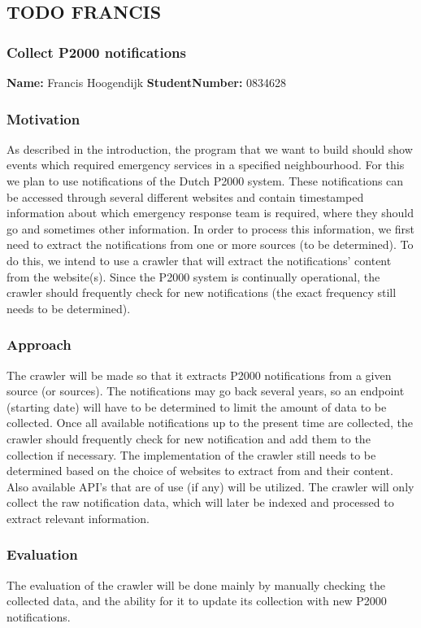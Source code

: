 \subsection{TODO FRANCIS}
\subsubsection*{Collect P2000 notifications}
\textbf{Name:} Francis Hoogendijk \indent \textbf{StudentNumber:} 0834628

\subsubsection*{Motivation}
As described in the introduction, the program that we want to build should show events which required emergency services in a specified neighbourhood. For this we plan to use notifications of the Dutch P2000 system. These notifications can be accessed through several different websites and contain timestamped information about which emergency response team is required, where they should go and sometimes other information. In order to process this information, we first need to extract the notifications from one or more sources (to be determined). To do this, we intend to use a crawler that will extract the notifications' content from the website(s). Since the P2000 system is continually operational, the crawler should frequently check for new notifications (the exact frequency still needs to be determined). 

\subsubsection*{Approach}
The crawler will be made so that it extracts P2000 notifications from a given source (or sources). The notifications may go back several years, so an endpoint (starting date) will have to be determined to limit the amount of data to be collected. Once all available notifications up to the present time are collected, the crawler should frequently check for new notification and add them to the collection if necessary. The implementation of the crawler still needs to be determined based on the choice of websites to extract from and their content. Also available API's that are of use (if any) will be utilized. The crawler will only collect the raw notification data, which will later be indexed and processed to extract relevant information. 

\subsubsection*{Evaluation}
The evaluation of the crawler will be done mainly by manually checking the collected data, and the ability for it to update its collection with new P2000 notifications.